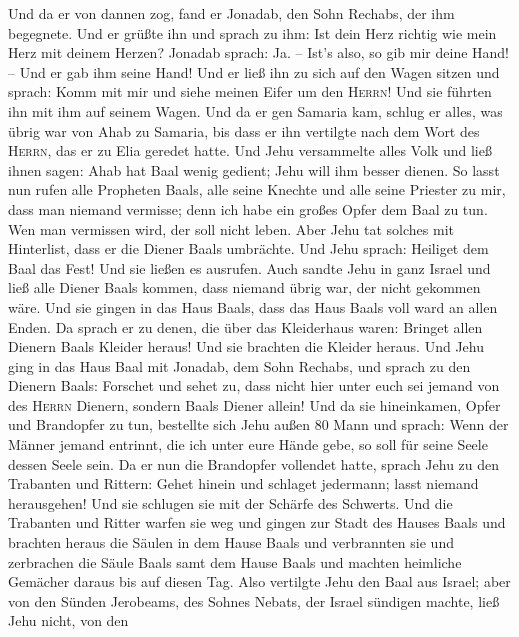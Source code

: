  Und da er von dannen zog, fand er Jonadab, den Sohn
Rechabs, der ihm begegnete. Und er grüßte ihn und sprach zu ihm: Ist
dein Herz richtig wie mein Herz mit deinem Herzen? Jonadab sprach: Ja.
-- Ist's also, so gib mir deine Hand! -- Und er gab ihm seine Hand! Und
er ließ ihn zu sich auf den Wagen sitzen  und sprach:
Komm mit mir und siehe meinen Eifer um den \textsc{Herrn}! Und sie
führten ihn mit ihm auf seinem Wagen.  Und da er gen
Samaria kam, schlug er alles, was übrig war von Ahab zu Samaria, bis
dass er ihn vertilgte nach dem Wort des \textsc{Herrn}, das er zu Elia
geredet hatte.  Und Jehu versammelte alles Volk und ließ
ihnen sagen: Ahab hat Baal wenig gedient; Jehu will ihm besser dienen.
 So lasst nun rufen alle Propheten Baals, alle seine
Knechte und alle seine Priester zu mir, dass man niemand vermisse; denn
ich habe ein großes Opfer dem Baal zu tun. Wen man vermissen wird, der
soll nicht leben. Aber Jehu tat solches mit Hinterlist, dass er die
Diener Baals umbrächte.  Und Jehu sprach: Heiliget dem
Baal das Fest! Und sie ließen es ausrufen.  Auch sandte
Jehu in ganz Israel und ließ alle Diener Baals kommen, dass niemand
übrig war, der nicht gekommen wäre. Und sie gingen in das Haus Baals,
dass das Haus Baals voll ward an allen Enden.  Da sprach
er zu denen, die über das Kleiderhaus waren: Bringet allen Dienern Baals
Kleider heraus! Und sie brachten die Kleider heraus.  Und
Jehu ging in das Haus Baal mit Jonadab, dem Sohn Rechabs, und sprach zu
den Dienern Baals: Forschet und sehet zu, dass nicht hier unter euch sei
jemand von des \textsc{Herrn} Dienern, sondern Baals Diener allein!
 Und da sie hineinkamen, Opfer und Brandopfer zu tun,
bestellte sich Jehu außen 80 Mann und sprach: Wenn der Männer jemand
entrinnt, die ich unter eure Hände gebe, so soll für seine Seele dessen
Seele sein.  Da er nun die Brandopfer vollendet hatte,
sprach Jehu zu den Trabanten und Rittern: Gehet hinein und schlaget
jedermann; lasst niemand herausgehen! Und sie schlugen sie mit der
Schärfe des Schwerts. Und die Trabanten und Ritter warfen sie weg und
gingen zur Stadt des Hauses Baals  und brachten heraus
die Säulen in dem Hause Baals und verbrannten sie  und
zerbrachen die Säule Baals samt dem Hause Baals und machten heimliche
Gemächer daraus bis auf diesen Tag.  Also vertilgte Jehu
den Baal aus Israel;  aber von den Sünden Jerobeams, des
Sohnes Nebats, der Israel sündigen machte, ließ Jehu nicht, von den
